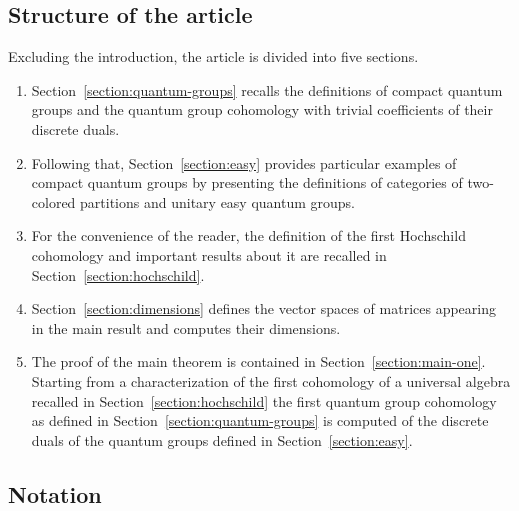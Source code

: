 \documentclass[pdftex]{sigma}
\numberwithin{equation}{section}
\begin{document}
\subsection{Structure of the article}
\label{section:introduction-structure-of-the-article}
Excluding the introduction, the article is divided into five sections.
\begin{enumerate}[label=$\square$]\itemsep=0pt
\item Section~\ref{section:quantum-groups} recalls the definitions of compact quantum groups and the quantum group cohomology with trivial coefficients of their discrete duals.
\item
Following that, Section~\ref{section:easy} provides particular examples of compact quantum groups by presenting the definitions of categories of two-co\-lo\-red partitions and unitary easy quantum groups.
\item
For the convenience of the reader, the definition of the first Hochschild cohomology and important results about it are recalled in Section~\ref{section:hochschild}.
\item
Section~\ref{section:dimensions} defines the vector spaces of matrices appearing in the main result and computes their dimensions.
\item
The proof of the main theorem is contained in Section~\ref{section:main-one}. Starting from a characterization of the first cohomology of a universal algebra recalled in Section~\ref{section:hochschild}  the first quantum group cohomology as defined in Section~\ref{section:quantum-groups} is computed of the discrete duals of the quantum groups defined in Section~\ref{section:easy}.
\end{enumerate}

\subsection{Notation}
\label{section:introduction-notation}

\makeatletter
\providecommand*{\cupdot}{%
  \mathbin{%
    \mathpalette\@cupdot{}%
  }%
}
\newcommand*{\@cupdot}[2]{%
  \ooalign{%
    $\m@th#1\cup$\cr
    \hidewidth$\m@th#1\cdot$\hidewidth
  }%
}
\makeatother

\makeatletter
\providecommand*{\bigcupdot}{%
  \mathbin{%
    \mathpalette\@bigcupdot{}%
  }%
}
\newcommand*{\@bigcupdot}[2]{%
  \ooalign{%
    $\m@th#1\bigcup$\cr
    \hidewidth$\m@th#1\cdot$\hidewidth
  }%
}
\makeatother
\end{document}
